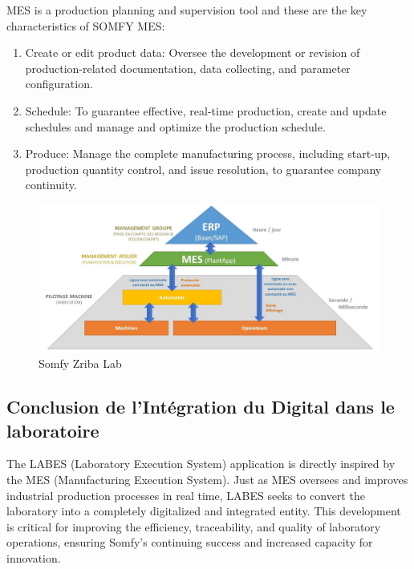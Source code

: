MES is a production planning and supervision tool and these are the key characteristics of SOMFY MES:

\begin{enumerate}
\item Create or edit product data: Oversee the development or revision of production-related documentation, data collecting, and parameter configuration.
\item Schedule: To guarantee effective, real-time production, create and update schedules and manage and optimize the production schedule.

\item Produce: Manage the complete manufacturing process, including start-up, production quantity control, and issue resolution, to guarantee company continuity.
\end{enumerate}
\begin{figure}[H]
    \centering
    \includegraphics[width=1\textwidth]{chapters/2/img/LES - Molka Abid.jpg}
    \caption{Somfy Zriba Lab}
    \label{fig:campus}
\end{figure}


\subsection{Conclusion de l'Intégration du Digital dans le laboratoire}

The LABES (Laboratory Execution System) application is directly inspired by the MES (Manufacturing Execution System). Just as MES oversees and improves industrial production processes in real time, LABES seeks to convert the laboratory into a completely digitalized and integrated entity.
This development is critical for improving the efficiency, traceability, and quality of laboratory operations, ensuring Somfy's continuing success and increased capacity for innovation.
